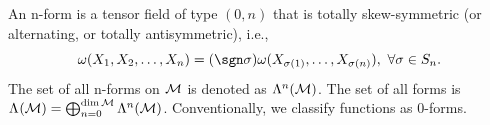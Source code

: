 \documentclass[../main.tex]{subfiles}
\begin{document}
    \begin{definition}[n-Forms]\label{def:n-forms}
        An n-form is a tensor field of type \((0, n)\) that is totally 
        skew-symmetric (or alternating, or totally antisymmetric), i.e., 
        \[
        \omega(X_1, X_2, \dots, X_n) = (\sgn \sigma)
        \omega(X_{\sigma(1)}, \dots, X_{\sigma(n)}), ~\forall \sigma \in S_n.
        \]
        The set of all n-forms on \(\manifold[M]\) is denoted as 
        \(\form{n}{M}\).
        The set of all forms is \(\form{}{M}=\bigoplus_{n=0}^{\dim \manifold[M]}
        \form{n}{M}\).
        Conventionally, we classify functions as 0-forms.
    \end{definition}
    \newpage
\end{document}
